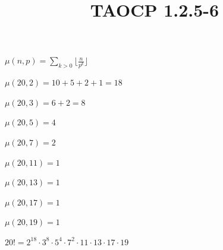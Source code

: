\documentclass{article}
\title{TAOCP 1.2.5\mbox{-}6}
\begin{document}
\maketitle

\( \mu(n,p) = \sum_{k > 0}{\lfloor{\frac{n}{p^{k}}}\rfloor} \)

\( \mu(20,2) = 10 + 5 + 2 + 1 = 18 \)

\( \mu(20,3) = 6 + 2 = 8 \)

\( \mu(20,5) = 4 \)

\( \mu(20,7) = 2 \)

\( \mu(20,11) = 1 \)

\( \mu(20,13) = 1 \)

\( \mu(20,17) = 1 \)

\( \mu(20,19) = 1 \)

\( 20! = 2^{18} \cdot 3^{8} \cdot 5^{4} \cdot 7^{2} \cdot 11 \cdot 13 \cdot 17 \cdot 19 \)
\end{document}
